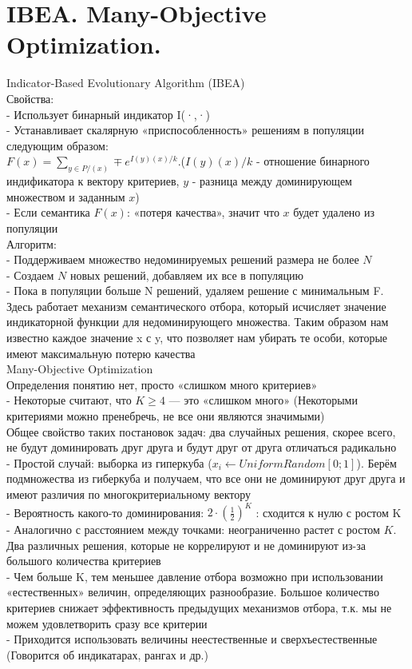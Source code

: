 \section{IBEA. Many-Objective Optimization.}
Indicator-Based Evolutionary Algorithm (IBEA)\\

Свойства:\\
- Использует бинарный индикатор I(·,·)\\
- Устанавливает скалярную «приспособленность» решениям в популяции следующим образом: \\
$F(x) = \sum_{y \in P/(x)} \mp e^{I(y)(x)/k}$.($I(y)(x)/k$ - отношение бинарного индификатора к вектору критериев, $y$ - разница между доминирующем множеством и заданным $x$)\\
- Если семантика $F(x)$: «потеря качества», значит что $x$ будет удалено из популяции\\

Алгоритм:\\
- Поддерживаем множество недоминируемых решений размера не более $N$\\
- Создаем $N$ новых решений, добавляем их все в популяцию\\
- Пока в популяции больше N решений, удаляем решение с минимальным F.\\

Здесь работает механизм семантического отбора, который исчисляет значение индикаторной функции для недоминирующего множества. Таким образом нам известно каждое значение x с y, что позволяет нам убирать те особи, которые имеют максимальную потерю качества\\

Many-Objective Optimization\\
Определения понятию нет, просто «слишком много критериев»\\
- Некоторые считают, что $K \geq 4$ — это «слишком много» (Некоторыми критериями можно пренебречь, не все они являются значимыми)\\
Общее свойство таких постановок задач: два случайных решения, скорее
всего, не будут доминировать друг друга и будут друг от друга отличаться радикально\\
- Простой случай: выборка из гиперкуба ($x_{i} ← UniformRandom[0; 1]$). Берём подмножества из гиберкуба и получаем, что все они не доминируют друг друга и имеют различия по многокритериальному вектору\\
- Вероятность какого-то доминирования: $2 · (\frac{1}{2})^K$ : сходится к нулю с ростом K\\
- Аналогично с расстоянием между точками: неограниченно растет с ростом $K$. Два различных решения, которые не коррелируют и не доминируют из-за большого количества критериев\\
- Чем больше K, тем меньшее давление отбора возможно при использовании «естественных» величин, определяющих разнообразие. Большое количество критериев снижает эффективность предыдущих механизмов отбора, т.к. мы не можем удовлетворить сразу все критерии  \\
- Приходится использовать величины неестественные и сверхъестественные (Говорится об индикатарах, рангах и др.) 
